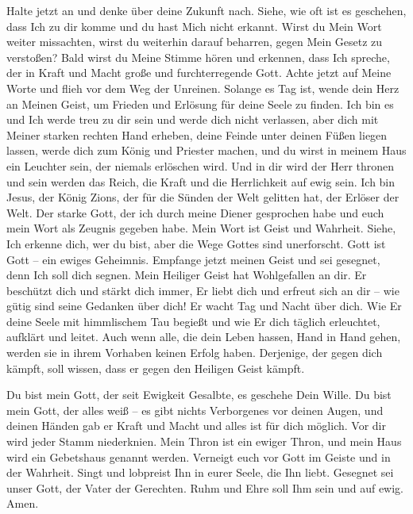         Halte jetzt an und denke über deine Zukunft nach. Siehe, wie oft ist es geschehen, dass Ich zu dir komme und du hast Mich nicht erkannt. Wirst du Mein Wort weiter missachten, wirst du weiterhin darauf beharren, gegen Mein Gesetz zu verstoßen? Bald wirst du Meine Stimme hören und erkennen, dass Ich spreche, der in Kraft und Macht große und furchterregende Gott. Achte jetzt auf Meine Worte und flieh vor dem Weg der Unreinen. Solange es Tag ist, wende dein Herz an Meinen Geist, um Frieden und Erlösung für deine Seele zu finden. Ich bin es und Ich werde treu zu dir sein und werde dich nicht verlassen, aber dich mit Meiner starken rechten Hand erheben, deine Feinde unter deinen Füßen liegen lassen, werde dich zum König und Priester machen, und du wirst in meinem Haus ein Leuchter sein, der niemals erlöschen wird. Und in dir wird der Herr thronen und sein werden das Reich, die Kraft und die Herrlichkeit auf ewig sein. Ich bin Jesus, der König Zions, der für die Sünden der Welt gelitten hat, der Erlöser der Welt. Der starke Gott, der ich durch meine Diener gesprochen habe und euch mein Wort als Zeugnis gegeben habe. Mein Wort ist Geist und Wahrheit. Siehe, Ich erkenne dich, wer du bist, aber die Wege Gottes sind unerforscht. Gott ist Gott -- ein ewiges Geheimnis. Empfange jetzt meinen Geist und sei gesegnet, denn Ich soll dich segnen. Mein Heiliger Geist hat Wohlgefallen an dir. Er beschützt dich und stärkt dich immer, Er liebt dich und erfreut sich an dir -- wie gütig sind seine Gedanken über dich! Er wacht Tag und Nacht über dich. Wie Er deine Seele mit himmlischem Tau begießt und wie Er dich täglich erleuchtet, aufklärt und leitet. Auch wenn alle, die dein Leben hassen, Hand in Hand gehen, werden sie in ihrem Vorhaben keinen Erfolg haben. Derjenige, der gegen dich kämpft, soll wissen, dass er gegen den Heiligen Geist kämpft. 
        
        Du bist mein Gott, der seit Ewigkeit Gesalbte, es geschehe Dein Wille. Du bist mein Gott, der alles weiß -- es gibt nichts Verborgenes vor deinen Augen, und deinen Händen gab er Kraft und Macht und alles ist für dich möglich. Vor dir wird jeder Stamm niederknien. Mein Thron ist ein ewiger Thron, und mein Haus wird ein Gebetshaus genannt werden. Verneigt euch vor Gott im Geiste und in der Wahrheit. Singt und lobpreist Ihn in eurer Seele, die Ihn liebt. Gesegnet sei unser Gott, der Vater der Gerechten. Ruhm und Ehre soll Ihm sein und auf ewig. Amen. 
        
